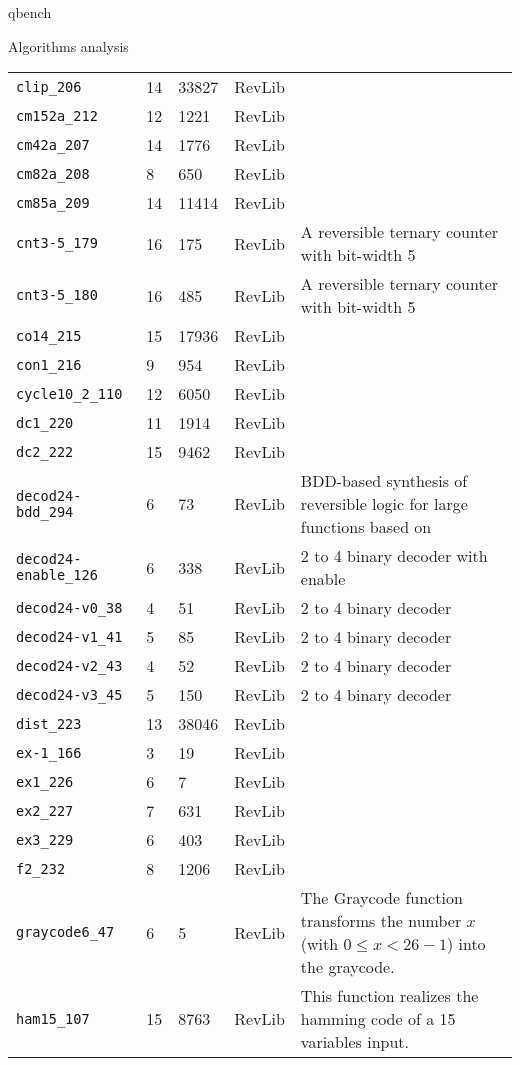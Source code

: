 \documentclass[11pt]{beamer}
\begin{document}
\begin{frame}[fragile,label={sec:org639c711}]{qbench}
\begin{block}{Algorithms analysis}
\begin{table}[htbp]
\begin{tabular}{|p{3cm}|p{1.5cm}|p{1cm}|p{1cm}|p{7.5cm}|}
\texttt{clip\_206} & 14 & 33827 & RevLib & \\
\texttt{cm152a\_212} & 12 & 1221 & RevLib & \\
\texttt{cm42a\_207} & 14 & 1776 & RevLib & \\
\texttt{cm82a\_208} & 8 & 650 & RevLib & \\
\texttt{cm85a\_209} & 14 & 11414 & RevLib & \\
\texttt{cnt3-5\_179} & 16 & 175 & RevLib & A reversible ternary counter with bit-width 5\\
\texttt{cnt3-5\_180} & 16 & 485 & RevLib & A reversible ternary counter with bit-width 5\\
\texttt{co14\_215} & 15 & 17936 & RevLib & \\
\texttt{con1\_216} & 9 & 954 & RevLib & \\
\texttt{cycle10\_2\_110} & 12 & 6050 & RevLib & \\
\texttt{dc1\_220} & 11 & 1914 & RevLib & \\
\texttt{dc2\_222} & 15 & 9462 & RevLib & \\
\texttt{decod24-bdd\_294} & 6 & 73 & RevLib & BDD-based synthesis of reversible logic for large functions based on \cite{Wille_2009}\\
\texttt{decod24-enable\_126} & 6 & 338 & RevLib & 2 to 4 binary decoder with enable\\
\texttt{decod24-v0\_38} & 4 & 51 & RevLib & 2 to 4 binary decoder\\
\texttt{decod24-v1\_41} & 5 & 85 & RevLib & 2 to 4 binary decoder\\
\texttt{decod24-v2\_43} & 4 & 52 & RevLib & 2 to 4 binary decoder\\
\texttt{decod24-v3\_45} & 5 & 150 & RevLib & 2 to 4 binary decoder\\
\texttt{dist\_223} & 13 & 38046 & RevLib & \\
\texttt{ex-1\_166} & 3 & 19 & RevLib & \\
\texttt{ex1\_226} & 6 & 7 & RevLib & \\
\texttt{ex2\_227} & 7 & 631 & RevLib & \\
\texttt{ex3\_229} & 6 & 403 & RevLib & \\
\texttt{f2\_232} & 8 & 1206 & RevLib & \\
\texttt{graycode6\_47} & 6 & 5 & RevLib & The Graycode function transforms the number \(x\) (with \(0 \le x<26-1\)) into the graycode.\\
\texttt{ham15\_107} & 15 & 8763 & RevLib & This function realizes the hamming code of a 15 variables input.\\

\end{tabular}
\end{table}
\end{block}
\end{frame}
\end{document}
